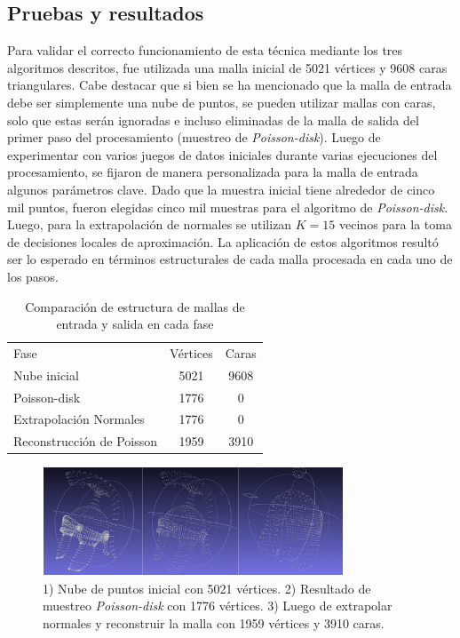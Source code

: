 \subsection{Pruebas y resultados}

Para validar el correcto funcionamiento de esta técnica mediante los tres algoritmos descritos, fue utilizada una malla inicial de 5021 vértices y 9608 caras triangulares. Cabe destacar que si bien se ha mencionado que la malla de entrada debe ser simplemente una nube de puntos, se pueden utilizar mallas con caras, solo que estas serán ignoradas e incluso eliminadas de la malla de salida del primer paso del procesamiento (muestreo de \emph{Poisson-disk}).
Luego de experimentar con varios juegos de datos iniciales durante varias ejecuciones del procesamiento, se fijaron de manera personalizada para la malla de entrada algunos parámetros clave. Dado que la muestra inicial tiene alrededor de cinco mil puntos, fueron elegidas cinco mil muestras para el algoritmo de \emph{Poisson-disk}. Luego, para la extrapolación de normales se utilizan $K=15$ vecinos para la toma de decisiones locales de aproximación.
La aplicación de estos algoritmos resultó ser lo esperado en términos estructurales de cada malla procesada en cada uno de los pasos.

\begin{table}
\begin{center}
\begin{tabular}{|l||cc|} \hline
	Fase & Vértices & Caras \\
	Nube inicial & 5021 & 9608 \\
	Poisson-disk & 1776 & 0 \\
	Extrapolación Normales & 1776 & 0 \\
	Reconstrucción de Poisson & 1959 & 3910 \\ \hline %
\end{tabular}
\caption{Comparación de estructura de mallas de entrada y salida en cada fase}
\end{center}
\end{table}

\begin{figure}[H]
  \centering
    \includegraphics[width=0.8\textwidth]{./Cap6_reconstruccion/malla-nubepuntos.png}
  \caption{1) Nube de puntos inicial con 5021 vértices. 2) Resultado de muestreo \emph{Poisson-disk} con 1776 vértices. 3) Luego de extrapolar normales y reconstruir la malla con 1959 vértices y 3910 caras.}
  \label{fig:Mesh-Results}
\end{figure}
 
